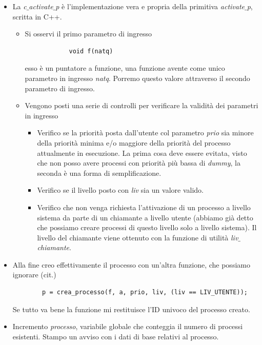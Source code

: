 \begin{itemize}
	\item La \emph{c$\_$activate$\_$p} è l'implementazione vera e propria della primitiva \emph{activate$\_$p}, scritta in C++. 
	\begin{itemize}
		\item Si osservi il primo parametro di ingresso
		\begin{verbatim}
			void f(natq)
		\end{verbatim}
		esso è un puntatore a funzione, una funzione avente come unico parametro in ingresso \emph{natq}. Porremo questo valore attraverso il secondo parametro di ingresso.
		\item Vengono posti una serie di controlli per verificare la validità dei parametri in ingresso
		\begin{itemize}
			\item Verifico se la priorità posta dall'utente col parametro \emph{prio} sia minore della priorità minima e/o maggiore della priorità del processo attualmente in esecuzione. La prima cosa deve essere evitata, visto che non posso avere processi con priorità più bassa di \emph{dummy}, la seconda è una forma di semplificazione.
			\item Verifico se il livello posto con \emph{liv} sia un valore valido.
			\item Verifico che non venga richiesta l'attivazione di un processo a livello sistema da parte di un chiamante a livello utente (abbiamo già detto che possiamo creare processi di questo livello solo a livello sistema). Il livello del chiamante viene ottenuto con la funzione di utilità \emph{liv$\_$chiamante}.
		\end{itemize}
	\end{itemize}
	\item Alla fine creo effettivamente il processo con un'altra funzione, che possiamo ignorare (cit.)
	\begin{verbatim}
		p = crea_processo(f, a, prio, liv, (liv == LIV_UTENTE));
	\end{verbatim}
	Se tutto va bene la funzione mi restituisce l'ID univoco del processo creato.
	\item Incremento \emph{processo}, variabile globale che conteggia il numero di processi esistenti. Stampo un avviso con i dati di base relativi al processo.
\end{itemize}
